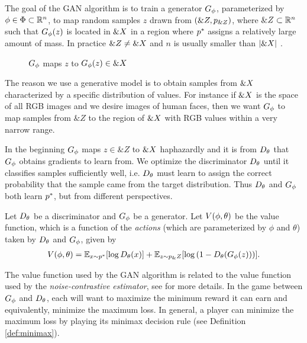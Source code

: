 The goal of the GAN algorithm is to train a generator $G_\phi$, parameterized by
$\phi \in \Phi \subset \mathbb{R}^n$, to map random samples $z$ drawn from $(\&Z,
p_{\&Z})$, where $\&Z \subset \mathbb{R}^n$ such that $G_\phi(z)$ is located in
$\&X$ in a region where $p^*$ assigns a relatively large amount of mass. In
practice $\&Z \not = \&X$ and $n$ is usually smaller than $|\&X|$
\cite{ref:arjovsky-2017}.

\begin{figure}[H]
  \centering
  \caption{$G_\phi$ maps $z$ to $G_\phi(z) \in \&X$}%
  \label{fig:g-maps}
\end{figure}

The reason we use a generative model is to obtain samples from $\&X$
characterized by a specific distribution of values. For instance if $\&X$ is
the space of all RGB images and we desire images of human faces, then we want
$G_\phi$ to map samples from $\&Z$ to the region of $\&X$ with RGB values within
a very narrow range.

In the beginning $G_\phi$ maps $z \in \&Z$ to $\&X$ haphazardly and it is from
$D_\theta$ that $G_\phi$ obtains gradients to learn from. We optimize the discriminator
$D_\theta$ until it classifies samples sufficiently well, i.e. $D_\theta$ must learn to
assign the correct probability that the sample came from the target
distribution. Thus $D_\theta$ and $G_\phi$ both learn $p^*$, but from different
perspectives.

Let $D_\theta$ be a discriminator and $G_\phi$ be a generator. Let $V(\phi, \theta)$ be the value
function, which is a function of the \textit{actions} (which are parameterized
by $\phi$ and $\theta$) taken by $D_\theta$ and $G_\phi$, given by
\begin{align}
  \label{eq:the-original-objective-function}
  V(\phi, \theta) = \mathbb{E}_{x \sim p^*}[{\log D_\theta(x})] +
  \mathbb{E}_{z \sim p_\&Z}[\log{(1 - D_\theta(G_\phi(z)))}].
\end{align}

The value function used by the GAN algorithm is related to the value
function used by the \textit{noise-contrastive estimator}, see
\cite{ref:gutmann-2010} for more details. In the game between $G_\phi$ and
$D_\theta$, each will want to maximize the minimum reward it can earn and
equivalently, minimize the maximum loss. In general, a player can
minimize the maximum loss by playing its minimax decision rule (see
Definition \ref{def:minimax}).


